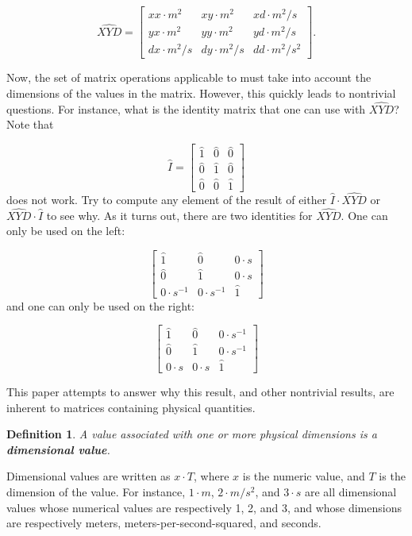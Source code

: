 \documentclass[10pt,letterpaper]{article}
\newtheorem{defn}{Definition}[section]
\numberwithin{equation}{section}
\begin{document}
\[ \widehat{XYD}= \left[ \begin{matrix}
  xx \cdot m^2 & xy \cdot m^2 & xd \cdot m^2/s \\
  yx \cdot m^2 & yy \cdot m^2 & yd \cdot m^2/s \\
  dx \cdot m^2/s & dy \cdot m^2/s & dd \cdot m^2/s^2
\end{matrix} \right]. \]

Now, the set of matrix operations applicable to must take into account
the dimensions of the values in the matrix.  However, this quickly
leads to nontrivial questions.  For instance, what is the identity
matrix that one can use with $\widehat{XYD}$?  Note that

\[ \hat I = \left[ \begin{matrix} 
  \hat 1 & \hat 0 & \hat 0 \\
  \hat 0 & \hat 1 & \hat 0 \\
  \hat 0 & \hat 0 & \hat 1
 \end{matrix} \right] \] does not work.  Try to compute any element of
the result of either $\hat I \cdot \widehat{XYD}$ or $\widehat{XYD}
\cdot \hat I$ to see why.  As it turns out, there are two identities
for $\widehat{XYD}$.  One can only be used on the left:
 
 \[ \left[ \begin{matrix} 
  \hat 1 & \hat 0 & 0 \cdot s \\
  \hat 0 & \hat 1 & 0 \cdot s \\
  0 \cdot s^{-1} & 0 \cdot s^{-1} & \hat 1
 \end{matrix} \right] \] and one can only be used on the right:

\[ \left[ \begin{matrix} 
  \hat 1 & \hat 0 & 0 \cdot s^{-1} \\
  \hat 0 & \hat 1 & 0 \cdot s^{-1} \\
  0 \cdot s & 0 \cdot s & \hat 1
 \end{matrix} \right] \]
 
This paper attempts to answer why this result, and other nontrivial
results, are inherent to matrices containing physical quantities.

\begin{defn} A value associated with one or more physical dimensions
  is a \textbf{dimensional value}. \end{defn}

Dimensional values are written as $x \cdot T$, where $x$ is the
numeric value, and $T$ is the dimension of the value.  For instance,
$1 \cdot m$, $2 \cdot m/s^2$, and $3 \cdot s$ are all dimensional
values whose numerical values are respectively 1, 2, and 3, and whose
dimensions are respectively meters, meters-per-second-squared, and
seconds.
 
\end{document}
